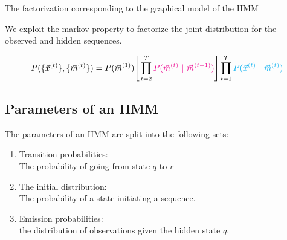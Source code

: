 \begin{frame}{The factorization corresponding to the graphical model of the HMM}



We exploit the markov property to factorize the joint distribution for the observed and hidden sequences.

\begin{align}
P(\{\vec{x}^{(t)}\}  , \{\vec{m}^{(t)}\}) = 
		P(\vec{m}^{(1)})
		\Bigg\lbrack
		\prod_{t=2}^T
		{\color{magenta}
		P(\vec{m}^{(t)} ~|~ \vec{m}^{(t-1)})
		}
		\Bigg\rbrack
		\prod_{t=1}^T 
		{\color{cyan}
		P(\vec{x}^{(t)} ~|~ \vec{m}^{(t)})
		}
\end{align}


\end{frame}

\subsection{Parameters of an HMM}


\begin{frame}{\subsecname}

The parameters of an HMM are split into the following sets:
\begin{enumerate}
\item {Transition probabilities}:\\
The probability of going from state $q$ to $r$ 
\item The initial distribution:\\
The probability of a state initiating a sequence.  
\item Emission probabilities:\\
the distribution of observations given the hidden state $q$.  
\end{enumerate}

\end{frame}

